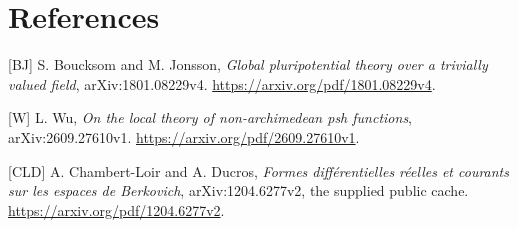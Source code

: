 \documentclass[
  11pt,
]{article}
\begin{document}
\section{References}\label{references}

{[}BJ{]} S. Boucksom and M. Jonsson, \emph{Global pluripotential theory
over a trivially valued field}, arXiv:1801.08229v4.
\url{https://arxiv.org/pdf/1801.08229v4}.

{[}W{]} L. Wu, \emph{On the local theory of non-archimedean psh
functions}, arXiv:2609.27610v1.
\url{https://arxiv.org/pdf/2609.27610v1}.

{[}CLD{]} A. Chambert-Loir and A. Ducros, \emph{Formes différentielles
réelles et courants sur les espaces de Berkovich}, arXiv:1204.6277v2,
the supplied public cache. \url{https://arxiv.org/pdf/1204.6277v2}.
\end{document}

